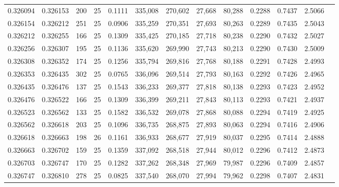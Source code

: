 \begin{tabular}{rrrrrrrrrrrrr}
0.326094 & 0.326153 &   200 &  25 &                                     0.1111 & 335,008 & 270,602 &  27,668 &  80,288 & 0.2288 & 0.7437 & 2.5066 \\
0.326154 & 0.326212 &   251 &  25 &                                     0.0906 & 335,259 & 270,351 &  27,693 &  80,263 & 0.2289 & 0.7435 & 2.5043 \\
0.326212 & 0.326255 &   166 &  25 &                                     0.1309 & 335,425 & 270,185 &  27,718 &  80,238 & 0.2290 & 0.7432 & 2.5027 \\
0.326256 & 0.326307 &   195 &  25 &                                     0.1136 & 335,620 & 269,990 &  27,743 &  80,213 & 0.2290 & 0.7430 & 2.5009 \\
0.326308 & 0.326352 &   174 &  25 &                                     0.1256 & 335,794 & 269,816 &  27,768 &  80,188 & 0.2291 & 0.7428 & 2.4993 \\
0.326353 & 0.326435 &   302 &  25 &                                     0.0765 & 336,096 & 269,514 &  27,793 &  80,163 & 0.2292 & 0.7426 & 2.4965 \\
0.326435 & 0.326476 &   137 &  25 &                                     0.1543 & 336,233 & 269,377 &  27,818 &  80,138 & 0.2293 & 0.7423 & 2.4952 \\
0.326476 & 0.326522 &   166 &  25 &                                     0.1309 & 336,399 & 269,211 &  27,843 &  80,113 & 0.2293 & 0.7421 & 2.4937 \\
0.326523 & 0.326562 &   133 &  25 &                                     0.1582 & 336,532 & 269,078 &  27,868 &  80,088 & 0.2294 & 0.7419 & 2.4925 \\
0.326562 & 0.326618 &   203 &  25 &                                     0.1096 & 336,735 & 268,875 &  27,893 &  80,063 & 0.2294 & 0.7416 & 2.4906 \\
0.326618 & 0.326663 &   198 &  26 &                                     0.1161 & 336,933 & 268,677 &  27,919 &  80,037 & 0.2295 & 0.7414 & 2.4888 \\
0.326663 & 0.326702 &   159 &  25 &                                     0.1359 & 337,092 & 268,518 &  27,944 &  80,012 & 0.2296 & 0.7412 & 2.4873 \\
0.326703 & 0.326747 &   170 &  25 &                                     0.1282 & 337,262 & 268,348 &  27,969 &  79,987 & 0.2296 & 0.7409 & 2.4857 \\
0.326747 & 0.326810 &   278 &  25 &                                     0.0825 & 337,540 & 268,070 &  27,994 &  79,962 & 0.2298 & 0.7407 & 2.4831 \\

\end{tabular}
